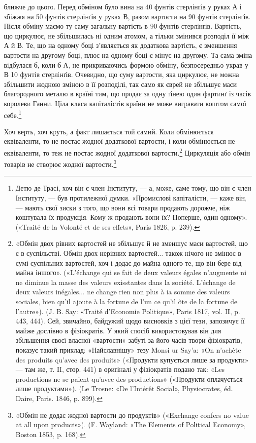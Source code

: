 \parcont{}  %
ближче до цього. Перед обміном було вина на 40 фунтів стерлінґів
у руках А і збіжжя на 50 фунтів стерлінґів у руках В, разом
вартости на 90 фунтів стерлінґів. Після обміну маємо ту саму
загальну вартість в 90 фунтів стерлінґів. Вартість, що циркулює,
не збільшилась ні одним атомом, а тільки змінився розподіл її
між А й В. Те, що на одному боці з’являється як додаткова вартість,
є зменшення вартости на другому боці, плюс на одному
боці є мінус на другому. Та сама зміна відбулася б, коли б А, не
прикриваючись формою обміну, безпосередньо украв у В 10 фунтів
стерлінґів. Очевидно, що суму вартости, яка циркулює, не
можна збільшити жодною зміною в її розподілі, так само як єврей
не збільшує маси благородного металю в країні тим, що продає
за одну ґінею один фартинґ із часів королеви Ганни. Ціла
кляса капіталістів країни не може вигравати коштом самої себе.\footnote{
Детю де Трасі, хоч він є член Інституту, — а, може, саме тому,
що він є член Інституту, — був протилежної думки. «Промислові капіталісти,
— каже він, — мають свої зиски з того, що вони всі товари продають
дорожче, ніж коштувала їх продукція. Кому ж продають вони їх?
Поперше, один одному». («Traité de la Volonté et de ses effets», Paris
1826, p. 239).
}

Хоч верть, хоч круть, а факт лишається той самий. Коли обмінюється
еквіваленти, то не постає жодної додаткової вартости,
і коли обмінюється не-еквіваленти, то теж не постає жодної додаткової
вартости.\footnote{
«Обмін двох рівних вартостей не збільшує й не зменшує маси вартостей,
що є в суспільстві. Обмін двох нерівних вартостей... також нічого
не змінює в сумі суспільних вартостей, хоч і додає до майна одного те,
що він бере від майна іншого». («L’échange qui se fait de deux valeurs
égales n’augmente ni ne diminue la masse des valeurs exisstantes dans la
société. L’échange de deux valeurs inégales... ne change rien non plus à ia
somme des valeurs sociales, bien qu’il ajoute à la fortune de l’un ce qu’il
ôte de la fortune de l’autre»). (J. B. Say: «Traité d’Economie Politique»,
Paris 1817, vol. II, p. 443, 444). Сей, звичайно, байдужий щодо висновків
з цієї тези, запозичує її майже дослівно в фізіократів. У який спосіб використовував
він для збільшення своєї власної «вартости» забуті за його
часів твори фізіократів, показує такий приклад: «Найславнішу» тезу
Monsi ur Say’a: «On n’achète des produits qu’avec des produits» («Продукти
купується лише за продукти» — там же, т. II, стор. 441) в ориґіналі
у фізіократів подано так: «Les productions ne se paient qu’avec des
productions» («Продукти оплачується лише продуктами»). (Le Trosne:
«De l’Intérêt Social», Physiocrates, éd. Daire, Paris. 1846, p. 899).
} Циркуляція або обмін товарів не створює
жодної вартости.\footnote{
«Обмін не додає жодної вартости до продуктів» («Exchange confers
no value at all upon products»). (F. Wayland: «The Elements of Political
Economy», Boston 1853, p. 168).
}

